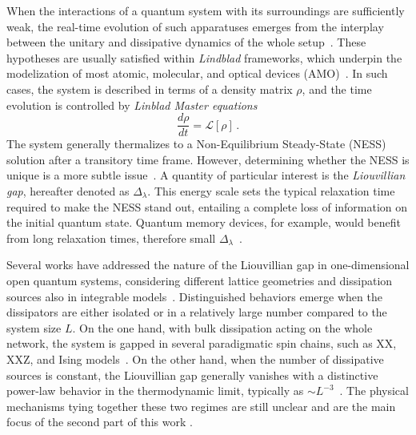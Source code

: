 When the interactions of a quantum system with its surroundings are sufficiently weak, the real-time evolution of such apparatuses emerges from the interplay between the unitary and dissipative dynamics of the whole setup~\cite{RV-2021-coherentanddissipativedynamicsreview}. These hypotheses are usually satisfied within \textit{Lindblad} frameworks, which underpin the modelization of most atomic, molecular, and optical devices (AMO)~\cite{BDS-2015-KeldyshOptical}. In such cases, the system is described in terms of a density matrix $\rho$, and the time evolution is controlled by \textit{Linblad Master equations}
\begin{equation}
    \frac{d\rho}{dt} = \mathcal{L}[\rho]\,.
    \label{eq_def_intro_lindblad}
\end{equation}
The system generally thermalizes to a Non-Equilibrium Steady-State (NESS) solution after a transitory time frame. However, determining whether the NESS is unique is a more subtle issue~\cite{N-2019-uniquenesslindblad, SW-2010-openuniquesolution}. A quantity of particular interest is the \textit{Liouvillian gap}, hereafter denoted as $\Delta_\lambda$. This energy scale sets the typical relaxation time required to make the NESS stand out, entailing a complete loss of information on the initial quantum state. Quantum memory devices, for example, would benefit from long relaxation times, therefore small $\Delta_\lambda$~\cite{CCP-2011-quantummemories}.

Several works have addressed the nature of the Liouvillian gap in one-dimensional open quantum systems, considering different lattice geometries and dissipation sources also in integrable models~\cite{Z-2015-relaxtimes}. Distinguished behaviors emerge when the dissipators are either isolated or in a relatively large number compared to the system size $L$.
On the one hand, with bulk dissipation acting on the whole network, the system is gapped in several paradigmatic spin chains, such as XX, XXZ, and Ising models~\cite{YWHWD-2021-artificialnetweork, Z-2015-relaxtimes, KS-2019-nonhermitiankitaevladder}. On the other hand, when the number of dissipative sources is constant, the Liouvillian gap generally vanishes with a distinctive power-law behavior in the thermodynamic limit, typically as $\sim L^{-3}$~\cite{KS-2020-boundarydephasing, TV-2021-dissipativeboundaries, Z-2011-XXXchaingap}.
The physical mechanisms tying together these two regimes are still unclear and are the main focus of the second part of this work \cite{franchi2023Liouvillian}.

